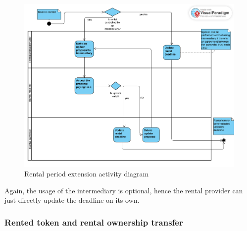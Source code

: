 \documentclass[english, LaM, oneside]{sapthesis}%
\begin{document}
\begin{figure}[H]
    \centering
        \begin{adjustbox}{width=1\textwidth}
            \includegraphics{ActivityDiagrams/activity_rentalUpdate.pdf} 
        \end{adjustbox}
    \caption{Rental period extension activity diagram}
    \label{fig:RentalUpdate AD}
\end{figure}

Again, the usage of the intermediary is optional, hence the rental provider can just directly update the deadline on its own.

\subsubsection{Rented token and rental ownership transfer}
\end{document}
